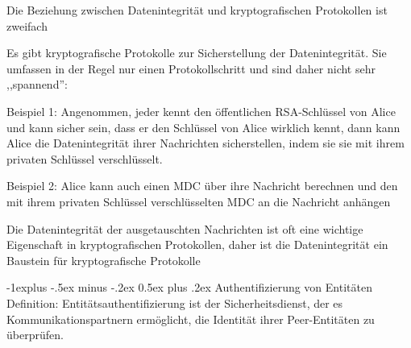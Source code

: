 \documentclass[a4paper]{article}
\makeatletter
\renewcommand{\subsection}{\@startsection{subsection}{2}{0mm}%
 {-1explus -.5ex minus -.2ex}%
 {0.5ex plus .2ex}%
 {\normalfont\normalsize\bfseries}}
\makeatother
\begin{document}
\begin{multicols}{3}
      \begin{itemize*}
            \item Die Beziehung zwischen Datenintegrität und kryptografischen Protokollen ist zweifach
            \begin{itemize*}
                  \item Es gibt kryptografische Protokolle zur Sicherstellung der Datenintegrität. Sie umfassen in der Regel nur einen Protokollschritt und sind daher nicht sehr ,,spannend'':
                  \begin{itemize*}
                        \item Beispiel 1: Angenommen, jeder kennt den öffentlichen RSA-Schlüssel von Alice und kann sicher sein, dass er den Schlüssel von Alice wirklich kennt, dann kann Alice die Datenintegrität ihrer Nachrichten sicherstellen, indem sie sie mit ihrem privaten Schlüssel verschlüsselt.
                        \item Beispiel 2: Alice kann auch einen MDC über ihre Nachricht berechnen und den mit ihrem privaten Schlüssel verschlüsselten MDC an die Nachricht anhängen
                  \end{itemize*}
                  \item Die Datenintegrität der ausgetauschten Nachrichten ist oft eine wichtige Eigenschaft in kryptografischen Protokollen, daher ist die Datenintegrität ein Baustein für kryptografische Protokolle
            \end{itemize*}
      \end{itemize*}

      \subsection{Authentifizierung von Entitäten}
      Definition: Entitätsauthentifizierung ist der Sicherheitsdienst, der es Kommunikationspartnern ermöglicht, die Identität ihrer Peer-Entitäten zu überprüfen.


\end{multicols}
\end{document}
